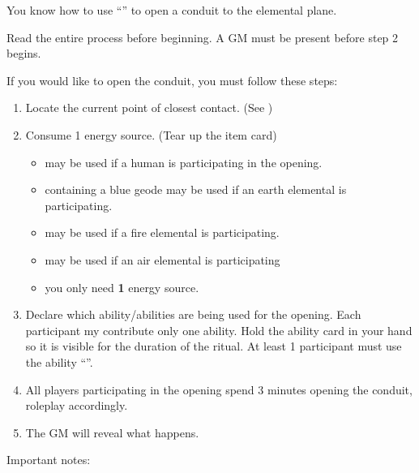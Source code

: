 \documentclass[green]{elementals}
\begin{document}
\name{\gConduit{}}

You know how to use ``\iCart{}'' to open a conduit to the elemental plane.

Read the entire process before beginning. A GM must be present before step 2 begins.

If you would like to open the conduit, you must follow these steps:
\begin{enumerate}
  \item Locate the current point of closest contact. (See \gConduitCover{})
  \item Consume 1 energy source. (Tear up the item card)
  \begin{itemize}
  	\item \iBattery{} may be used if a human is participating in the opening.
  	\item \iCrystalGeode{} containing a blue geode may be used if an earth elemental is participating.
  	\item \iLavaEmber{} may be used if a fire elemental is participating.
  	\item \iHandCrank{} may be used if an air elemental is participating
  	\item you only need {\bf 1} energy source.
  \end{itemize}
  \item Declare which ability/abilities are being used for the opening. Each participant my contribute only one ability. Hold the ability card in your hand so it is visible for the duration of the ritual. At least 1 participant must use the ability ``\aWorkConduit{}''. 
  \item All players participating in the opening spend 3 minutes opening the conduit, roleplay accordingly.
  \item The GM will reveal what happens.
\end{enumerate}

\vspace{10mm}

{\large Important notes:}
\end{document}
